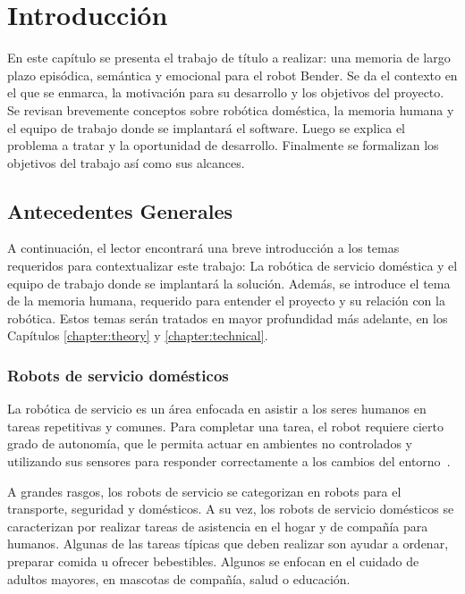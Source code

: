 \chapter{Introducción}\label{chapter:introduction}

En este capítulo se presenta el trabajo de título a realizar: una memoria de largo plazo episódica, semántica y emocional para el robot Bender. Se da el contexto en el que se enmarca, la motivación para su desarrollo y los objetivos del proyecto. Se revisan brevemente conceptos sobre robótica doméstica, la memoria humana y el equipo de trabajo donde se implantará el software. Luego se explica el problema a tratar y la oportunidad de desarrollo. Finalmente se formalizan los objetivos del trabajo así como sus alcances.


\section{Antecedentes Generales}

A continuación, el lector encontrará una breve introducción a los temas requeridos para contextualizar este trabajo: La robótica de servicio doméstica y el equipo de trabajo donde se implantará la solución. Además, se introduce el tema de la memoria humana, requerido para entender el proyecto y su relación con la robótica. Estos temas serán tratados en mayor profundidad más adelante, en los Capítulos \ref{chapter:theory} y \ref{chapter:technical}.


\subsection{Robots de servicio domésticos}

La robótica de servicio es un área enfocada en asistir a los seres humanos en tareas repetitivas y comunes. Para completar una tarea, el robot requiere cierto grado de autonomía, que le permita actuar en ambientes no controlados y utilizando sus sensores para responder correctamente a los cambios del entorno~\cite{IFR}.

A grandes rasgos, los robots de servicio se categorizan en robots para el transporte, seguridad y domésticos. A su vez, los robots de servicio domésticos se caracterizan por realizar tareas de asistencia en el hogar y de compañía para humanos. Algunas de las tareas típicas que deben realizar son ayudar a ordenar, preparar comida u ofrecer bebestibles. Algunos se enfocan en el cuidado de adultos mayores, en mascotas de compañía, salud o educación.

